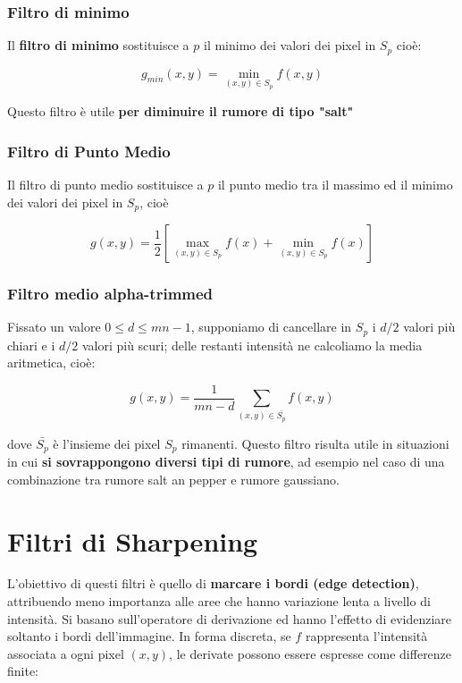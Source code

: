 \subsubsection{Filtro di minimo}

Il \textbf{filtro di minimo} sostituisce a $p$ il minimo dei valori dei pixel in
$S_p$ cioè:

$$
    g_{min}(x,y) = \min_{(x,y) \in S_p} f(x,y)
$$

Questo filtro è utile \textbf{per diminuire il rumore di tipo "salt"}

\subsubsection{Filtro di Punto Medio}

Il filtro di punto medio sostituisce a $p$ il punto medio tra il massimo ed il
minimo dei valori dei pixel in $S_p$, cioè

$$
    g(x,y) = \frac{1}{2} \left[\max_{(x,y) \in S_p} f(x) + \min_{(x,y) \in S_p} f(x)\right]
$$

\subsubsection{Filtro medio alpha-trimmed}

Fissato un valore $0 \le d \le mn - 1$, supponiamo di cancellare in $S_p$ i
$d/2$ valori più chiari e i $d/2$ valori più scuri; delle restanti intensità ne
calcoliamo la media aritmetica, cioè:

$$
    g(x,y) = \frac{1}{mn-d} \sum_{(x,y) \in \bar{S_p}} f(x,y)
$$

dove $\bar{S_p}$ è l'insieme dei pixel $S_p$ rimanenti. Questo filtro risulta
utile in situazioni in cui \textbf{si sovrappongono diversi tipi di rumore}, ad
esempio nel caso di una combinazione tra rumore salt an pepper e rumore
gaussiano.

\section{Filtri di Sharpening}

L'obiettivo di questi filtri è quello di \textbf{marcare i bordi (edge
    detection)}, attribuendo meno importanza alle aree che hanno variazione
lenta a livello di intensità. Si basano sull'operatore di derivazione ed
hanno l'effetto di evidenziare soltanto i bordi dell'immagine. In forma
discreta, se $f$ rappresenta l'intensità associata a ogni pixel $(x,y)$, le
derivate possono essere espresse come differenze finite:

